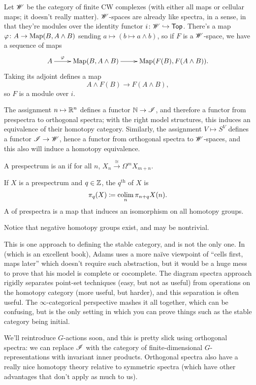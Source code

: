 \begin{exm}[$\sW$-spaces]
\label{wspaces}
Let $\sW$ be the category of finite CW complexes (with either all maps or cellular maps; it doesn't really matter).
$\sW$-spaces are already like spectra, in a sense, in that they're modules over the identity functor
$i\colon\mathscr W\hookrightarrow\mathsf{Top}$. There's a map $\varphi\colon A\to\operatorname{Map}(B, A\wedge B)$ sending $a\mapsto (b\mapsto a\wedge b)$, so
if $F$ is a
$\sW$-space, we have a sequence of maps
\[\xymatrix{
	A\ar[r]^-\vp & \Map(B, A\wedge B)\ar[r] &\Map(F(B), F(A\wedge B)).
}\]
Taking its adjoint defines a map
\[A\wedge F(B)\longrightarrow F(A\wedge B),\]
so $F$ is a module over $i$.
\end{exm}
The assignment $n\mapsto\R^n$ defines a functor $\mathbb N\to\mathscr I$, and therefore a functor from prespectra to orthogonal
spectra; with the right model structures, this induces an equivalence of their homotopy category. Similarly, the
assignment $V\mapsto S^V$ defines a functor $\mathscr I\to\mathscr W$, hence a functor from orthogonal spectra to $\sW$-spaces,
and this also will induce a homotopy equivalence.
\begin{defn}
A prespectrum is an  if for all $n$, $X_n\stackrel\cong\to\Omega^mX_{m+n}$.
\end{defn}
\begin{defn}
If $X$ is a prespectrum and $q\in\mathbb Z$, the $q^{\text{th}}$  of $X$ is
\[\pi_q(X)\coloneqq \operatorname*{colim}_n \pi_{n+q}X(n).\]
A  of prespectra is a map that induces an isomorphism on all homotopy groups.
\end{defn}
Notice that negative homotopy groups exist, and may be nontrivial.
\begin{rem}
This is one approach to defining the stable category, and is not the only one. In~\cite{AdamsStableHomotopy} (which
is an excellent book), Adams uses a more naïve viewpoint of ``cells first, maps later'' which doesn't require such
abstraction, but it would be a huge mess to prove that his model is complete or cocomplete. The diagram spectra
approach rigidly separates point-set techniques (easy, but not as useful) from operations on the homotopy category
(more useful, but harder), and this separation is often useful. The $\infty$-categorical perspective mashes it all
together, which can be confusing, but is the only setting in which you can prove things such as the stable
category being initial.
\end{rem}
We'll reintroduce $G$-actions soon, and this is pretty slick using orthogonal spectra: we can replace $\mathscr I$ with
the category of finite-dimensional $G$-representations with invariant inner products. Orthogonal spectra also have
a really nice homotopy theory relative to symmetric spectra (which have other advantages that don't apply as much
to us).
